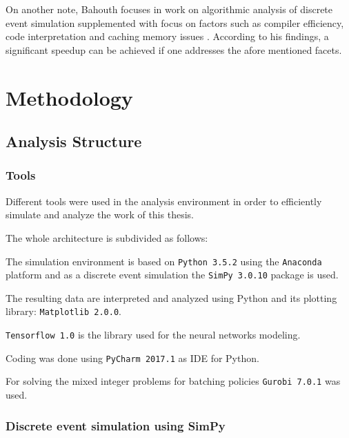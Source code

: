 \documentclass{seal_thesis}
\begin{document}
On another note, Bahouth focuses in work on algorithmic analysis of discrete event simulation supplemented with focus on factors such as compiler efficiency, code interpretation and caching memory issues \cite{Bahouth2007}. According to his findings, a significant speedup can be achieved if one addresses the afore mentioned facets.


\chapter{Methodology}
\label{ch:methodology}

\section{Analysis Structure}
\subsection{Tools}
Different tools were used in the analysis environment in order to efficiently simulate and analyze the work of this thesis.

The whole architecture is subdivided as follows:
\begin{enumerate*}
	\item The simulation environment is based on \texttt{Python 3.5.2} using the \texttt{Anaconda} platform and as a discrete event simulation the \texttt{SimPy 3.0.10} package is used.
	\item The resulting data are interpreted and analyzed using Python and its plotting library: \texttt{Matplotlib 2.0.0}.
	\item \texttt{Tensorflow 1.0} is the library used for the neural networks modeling.
	\item Coding was done using \texttt{PyCharm 2017.1} as IDE for Python.
	\item For solving the mixed integer problems for batching policies \texttt{Gurobi 7.0.1} was used.
\end{enumerate*}

\subsection{Discrete event simulation using SimPy}
\end{document}
